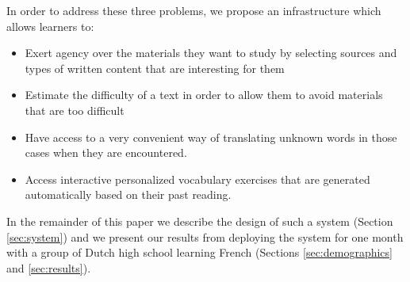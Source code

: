 In order to address these three problems, we propose an infrastructure which allows learners to: 

	\begin{itemize}
	
		\item Exert agency over the materials they want to study by selecting sources and types of written content that are interesting for them
	
		\item Estimate the difficulty of a text in order to allow them to avoid materials that are too difficult
	
		\item Have access to a very convenient way of translating unknown words in those cases when they are encountered.

		\item Access interactive personalized vocabulary exercises that are generated automatically based on their past reading.

	\end{itemize}

In the remainder of this paper we describe the design of such a system (Section \ref{sec:system}) and we present our results from deploying the system for one month with a group of Dutch high school \students learning French (Sections \ref{sec:demographics} and \ref{sec:results}). 

